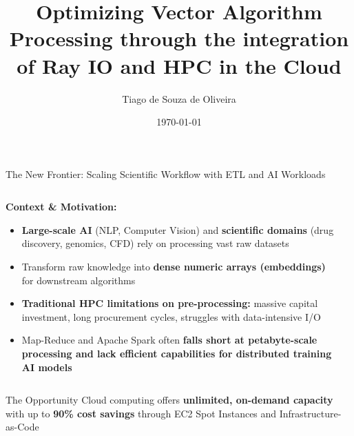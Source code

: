 \documentclass[aspectratio=169]{beamer}
\title[Optimizing Vector Algorithm Processing]{Optimizing Vector Algorithm Processing through the integration of Ray IO and HPC in the Cloud}
\author{Tiago de Souza de Oliveira}
\institute[University]{
    Master's Thesis Defense \\
    Computer Science Department
}
\date{\today}
\begin{document}
\frame{\titlepage}

\begin{frame}{The New Frontier: Scaling Scientific Workflow with ETL and AI Workloads}
    \begin{columns}
        \begin{column}{0.6\textwidth}
            \textbf{Context \& Motivation:}
            \begin{itemize}
                \item \textbf{Large-scale AI} (NLP, Computer Vision) and \textbf{scientific domains} (drug discovery, genomics, CFD) rely on processing vast raw datasets
                \item Transform raw knowledge into \textcolor{rayblue}{\textbf{dense numeric arrays (embeddings)}} for downstream algorithms
                \item \textbf{Traditional HPC limitations on pre-processing:} massive capital investment, long procurement cycles, struggles with data-intensive I/O
                \item Map-Reduce and Apache Spark often \textbf{falls short at petabyte-scale processing and lack efficient capabilities for distributed training AI models}
            \end{itemize}
        \end{column}
        \begin{column}{0.4\textwidth}
        \end{column}
    \end{columns}
    
    \vspace{0.3cm}
    \begin{alertblock}{The Opportunity}
        Cloud computing offers \textbf{unlimited, on-demand capacity} with up to \textcolor{awsorange}{\textbf{90\% cost savings}} through EC2 Spot Instances and Infrastructure-as-Code
    \end{alertblock}
\end{frame}
\end{document}
